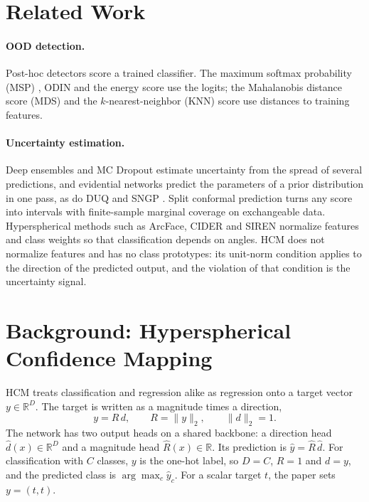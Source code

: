 \documentclass[letterpaper]{article} %
\begin{document}
\section{Related Work}
\label{sec:related}

\paragraph{OOD detection.} Post-hoc detectors score a trained classifier. The maximum softmax probability (MSP) \citep{hendrycks2017baseline}, ODIN \citep{liang2018enhancing} and the energy score \citep{liu2020energy} use the logits; the Mahalanobis distance score (MDS) \citep{lee2018simple} and the $k$-nearest-neighbor (KNN) score \citep{sun2022knn} use distances to training features.

\paragraph{Uncertainty estimation.} Deep ensembles and MC Dropout estimate uncertainty from the spread of several predictions, and evidential networks predict the parameters of a prior distribution in one pass, as do DUQ and SNGP \citep{vanamersfoort2020duq,liu2020sngp}. Split conformal prediction \citep{lei2018conformal,romano2019cqr} turns any score into intervals with finite-sample marginal coverage on exchangeable data. Hyperspherical methods such as ArcFace, CIDER and SIREN \citep{deng2019arcface,ming2023cider,du2022siren} normalize features and class weights so that classification depends on angles. HCM does not normalize features and has no class prototypes: its unit-norm condition applies to the direction of the predicted output, and the violation of that condition is the uncertainty signal.

\section{Background: Hyperspherical Confidence Mapping}
\label{sec:method}

HCM treats classification and regression alike as regression onto a target vector $y\in\mathbb{R}^D$. The target is written as a magnitude times a direction,
\[
  y = R\,d,\qquad R=\lVert y\rVert_2,\qquad \lVert d\rVert_2=1 .
\]
The network has two output heads on a shared backbone: a direction head $\hat d(x)\in\mathbb{R}^D$ and a magnitude head $\hat R(x)\in\mathbb{R}$. Its prediction is $\hat y=\hat R\,\hat d$. For classification with $C$ classes, $y$ is the one-hot label, so $D=C$, $R=1$ and $d=y$, and the predicted class is $\arg\max_c \hat y_c$. For a scalar target $t$, the paper sets $y=(t,t)$.
\end{document}
